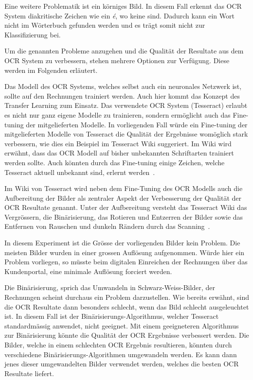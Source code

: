 Eine weitere Problematik ist ein körniges Bild. In diesem Fall erkennt das OCR System diakritische Zeichen wie ein \textit{é}, wo keine sind. Dadurch kann ein Wort nicht im Wörterbuch gefunden werden und es trägt somit nicht zur Klassifizierung bei.

Um die genannten Probleme anzugehen und die Qualität der Resultate aus dem OCR System zu verbessern, stehen mehrere Optionen zur Verfügung. Diese werden im Folgenden erläutert.

Das Modell des OCR Systems, welches selbst auch ein neuronales Netzwerk ist, sollte auf den Rechnungen trainiert werden. Auch hier kommt das Konzept des Transfer Learning zum Einsatz. Das verwendete OCR System (Tesseract) erlaubt es nicht nur ganz eigene Modelle zu trainieren, sondern ermöglicht auch das Fine-tuning der mitgelieferten Modelle. In vorliegenden Fall würde ein Fine-tuning der mitgelieferten Modelle von Tesseract die Qualität der Ergebnisse womöglich stark verbessern, wie dies ein Beispiel im Tesseract Wiki suggeriert. Im Wiki wird erwähnt, dass das OCR Modell auf bisher unbekannten Schriftarten trainiert werden sollte. Auch könnten durch das Fine-tuning einige Zeichen, welche Tesseract aktuell unbekannt sind, erlernt werden~\autocite{TesseractTraining}.

Im Wiki von Tesseract wird neben dem Fine-Tuning des OCR Modells auch die Aufbereitung der Bilder als zentraler Aspekt der Verbesserung der Qualität der OCR Resultate genannt. Unter der Aufbereitung versteht das Tesseract Wiki das Vergrössern, die Binärisierung, das Rotieren und Entzerren der Bilder sowie das Entfernen von Rauschen und dunkeln Rändern durch das Scanning~\autocite{TesseractQuality}.

In diesem Experiment ist die Grösse der vorliegenden Bilder kein Problem. Die meisten Bilder wurden in einer grossen Auflösung aufgenommen. Würde hier ein Problem vorliegen, so müsste beim digitalen Einreichen der Rechnungen über das Kundenportal, eine minimale Auflösung forciert werden.

Die Binärisierung, sprich das Umwandeln in Schwarz-Weiss-Bilder, der Rechnungen scheint durchaus ein Problem darzustellen. Wie bereits erwähnt, sind die OCR Resultate dann besonders schlecht, wenn das Bild schlecht ausgeleuchtet ist. In diesem Fall ist der Binärisierungs-Algorithmus, welcher Tesseract standardmässig anwendet, nicht geeignet. Mit einem geeigneteren Algorithmus zur Binärisierung könnte die Qualität der OCR Ergebnisse verbessert werden. Die Bilder, welche in einem schlechten OCR Ergebnis resultieren, könnten durch verschiedene Binärisierungs-Algorithmen umgewandeln werden. Es kann dann jenes dieser umgewandelten Bilder verwendet werden, welches die besten OCR Resultate liefert.


